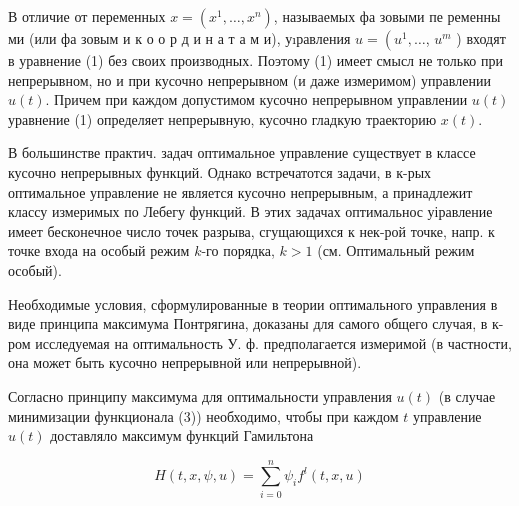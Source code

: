 \documentclass[10pt]{article}
\begin{document}
В отличие от переменных $x=\left(x^{1}, \ldots, x^{n}\right)$, называемых фа зовыми пе ременны ми (или фа зовым и к о о р д и н а т а м и), уıравления $u=\left(u^{1}, \ldots\right.$, $u^{m}$ ) входят в уравнение (1) без своих производных. Поэтому (1) имеет смысл не только при непрерывном, но и при кусочно непрерывном (и даже измеримом) управлении $u(t)$. Причем при каждом допустимом кусочно непрерывном управлении $u(t)$ уравнение (1) определяет непрерывную, кусочно гладкую траекторию $x(t)$.



В большинстве практич. задач оптимальное управление существует в классе кусочно непрерывных функций. Однако встречатотся задачи, в к-рых оптимальное управление не является кусочно непрерывным, а принадлежит классу измеримых по Лебегу функций. В этих задачах оптимальнос уіравление имеет бесконечное число точек разрыва, сгущающихся к нек-рой точке, напр. к точке входа на особый режим $k$-го порядка, $k>1$ (см. Оптимальный режим особый).



Необходимые условия, сформулированные в теории оптимального управления в виде принципа максимума Понтрягина, доказаны для самого общего случая, в к-ром исследуемая на оптимальность У. ф. предполагается измеримой (в частности, она может быть кусочно непрерывной или непрерывной).



Согласно принципу максимума для оптимальности управления $u(t)$ (в случае минимизации функционала (3)) необходимо, чтобы при каждом $t$ управление $u(t)$ доставляло максимум функций Гамильтона



\[

H(t, x, \psi, u)=\sum_{i=0}^{n} \psi_{i} f^{l}(t, x, u)

\]
\end{document}
